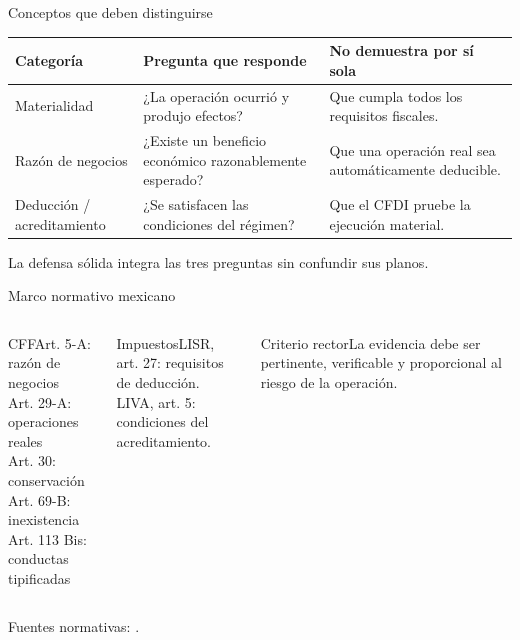 \documentclass[spanish,aspectratio=169,xcolor={dvipsnames,table}]{beamer}
\begin{document}
\begin{frame}{Conceptos que deben distinguirse}
  \begin{tabularx}{\linewidth}{@{}p{.24\linewidth}Y Y@{}}
    \toprule
    \textbf{Categoría} & \textbf{Pregunta que responde} & \textbf{No demuestra por sí sola}\\
    \midrule
    Materialidad & ¿La operación ocurrió y produjo efectos? & Que cumpla todos los requisitos fiscales.\\
    Razón de negocios & ¿Existe un beneficio económico razonablemente esperado? & Que una operación real sea automáticamente deducible.\\
    Deducción / acreditamiento & ¿Se satisfacen las condiciones del régimen? & Que el CFDI pruebe la ejecución material.\\
    \bottomrule
  \end{tabularx}
  \vfill\centering\small La defensa sólida integra las tres preguntas sin confundir sus planos.
\end{frame}

\begin{frame}{Marco normativo mexicano}
  \begin{columns}[T]
    \begin{column}{.31\textwidth}\begin{block}{CFF}\small Art. 5-A: razón de negocios\\Art. 29-A: operaciones reales\\Art. 30: conservación\\Art. 69-B: inexistencia\\Art. 113 Bis: conductas tipificadas\end{block}\end{column}
    \begin{column}{.31\textwidth}\begin{block}{Impuestos}\small LISR, art. 27: requisitos de deducción.\\LIVA, art. 5: condiciones del acreditamiento.\end{block}\end{column}
    \begin{column}{.31\textwidth}\begin{block}{Criterio rector}\small La evidencia debe ser pertinente, verificable y proporcional al riesgo de la operación.\end{block}\end{column}
  \end{columns}
  \vfill\centering\scriptsize Fuentes normativas: \parencite{cff2026,lisr2024,liva2021}.
\end{frame}
\end{document}
